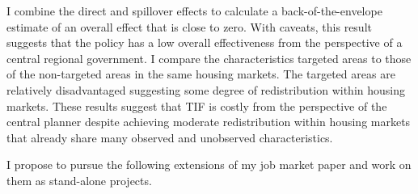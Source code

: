 I combine the direct and spillover effects to calculate a back-of-the-envelope estimate of an overall effect that is close to zero. With caveats, this result suggests that the policy has a low overall effectiveness from the perspective of a central regional government. I compare the characteristics targeted areas to those of the non-targeted areas in the same housing markets. The targeted areas are relatively disadvantaged suggesting some degree of redistribution within housing markets. These results suggest that TIF is costly from the perspective of the central planner despite achieving moderate redistribution within housing markets that already share many observed and unobserved characteristics. 

I propose to pursue the following extensions of my job market paper and work on them as stand-alone projects.

